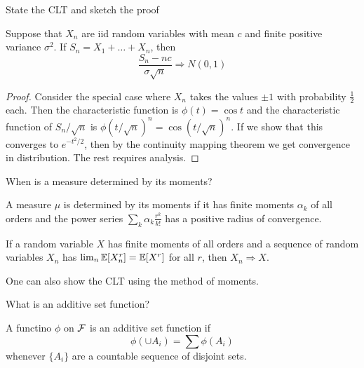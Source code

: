 \documentclass[avery5388,grid,frame]{flashcards}
\begin{document}
\begin{flashcard}
    {State the CLT and sketch the proof}
    \begin{theorem}
        Suppose that $X_n$ are iid random variables with mean $c$ and finite positive variance $\sigma^2$. If $S_n = X_1 + \dots + X_n$, then
        $$\frac{S_n - nc}{\sigma \sqrt n} \Rightarrow N(0,1)$$
    \end{theorem}

    \begin{proof}
        Consider the special case where $X_n$ takes the values $\pm 1$ with probability $\frac 1 2$ each. Then the characteristic function is $\phi(t) = \cos t$ and the characteristic function of $S_n / \sqrt n$ is $\phi(t / \sqrt n)^n = \cos(t / \sqrt n)^n$. If we show that this converges to $e^{-t^2/2}$, then by the continuity mapping theorem we get convergence in distribution. The rest requires analysis.
    \end{proof}
\end{flashcard}


\begin{flashcard}
    {When is a measure determined by its moments?}
    \begin{theorem}
        A measure $\mu$ is determined by its moments if it has finite moments $\alpha_k$ of all orders and the power series $\sum_k \alpha_k \frac{r^k}{k!}$ has a positive radius of convergence.
    \end{theorem}

    \begin{theorem}
        If a random variable $X$ has finite moments of all orders and a sequence of random variables $X_n$ has $\lim_n \mathbb{E}[X_n^r] = \mathbb{E}[X^r]$ for all $r$, then $X_n \Rightarrow X$.
    \end{theorem}

    \begin{remark}
        One can also show the CLT using the method of moments.
    \end{remark}
\end{flashcard}


\begin{flashcard}
    {What is an additive set function?}
    \begin{definition}
        A functino $\phi$ on $\mathcal F$ is an additive set function if
        $$\phi(\cup A_i) = \sum \phi(A_i)$$
        whenever $\{ A_i \}$ are a countable sequence of disjoint sets.
    \end{definition}
\end{flashcard}
\end{document}
